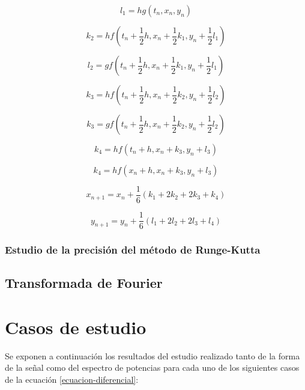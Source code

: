 \documentclass[11pt]{article}
\begin{document}
\begin{equation}
	l_1 = hg(t_n, x_n, y_n)
\end{equation}

\begin{equation}
	k_2 = hf(t_n + \frac{1}{2}h, x_n + \frac{1}{2}k_1, y_n + \frac{1}{2}l_1)
\end{equation}

\begin{equation}
	l_2 = gf(t_n + \frac{1}{2}h, x_n + \frac{1}{2}k_1, y_n + \frac{1}{2}l_1)
\end{equation}

\begin{equation}
	k_3 = hf(t_n + \frac{1}{2}h, x_n + \frac{1}{2}k_2, y_n + \frac{1}{2}l_2)
\end{equation}

\begin{equation}
	k_3 = gf(t_n + \frac{1}{2}h, x_n + \frac{1}{2}k_2, y_n + \frac{1}{2}l_2)
\end{equation}

\begin{equation}
	k_4 = hf(t_n + h, x_n + k_3, y_n + l_3)
\end{equation}

\begin{equation}
	k_4 = hf(x_n + h, x_n + k_3, y_n + l_3)
\end{equation} 

\begin{equation}
	x_{n+1} = x_n + \frac{1}{6}(k_1 + 2k_2 + 2k_3 + k_4)
\end{equation}

\begin{equation}
	y_{n+1} = y_n + \frac{1}{6}(l_1 + 2l_2 + 2l_3 + l_4)
\end{equation}

\subsubsection{Estudio de la precisión del método de Runge-Kutta}
\label{precision-runge-kutta}

\subsection{Transformada de Fourier}

\section{Casos de estudio}
Se exponen a continuación los resultados del estudio realizado tanto de la forma de la señal como del espectro de potencias para cada uno de los siguientes casos de la ecuación \ref{ecuacion-diferencial}:
\end{document}
